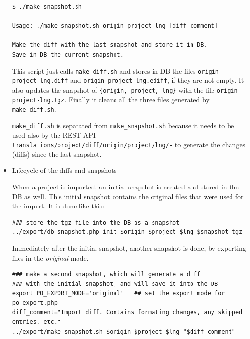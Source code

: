 \documentclass[11pt]{article}
\begin{document}
\begin{itemize}
\begin{verbatim}
$ ./make_snapshot.sh

Usage: ./make_snapshot.sh origin project lng [diff_comment]

Make the diff with the last snapshot and store it in DB.
Save in DB the current snapshot.
\end{verbatim}



     This script just calls \texttt{make\_diff.sh} and stores in DB the files
     \texttt{origin-project-lng.diff} and \texttt{origin-project-lng.ediff}, if they
     are not empty. It also updates the snapshot of \texttt{\{origin, project,      lng\}} with the file \texttt{origin-project-lng.tgz}. Finally it cleans all
     the three files generated by \texttt{make\_diff.sh}.

     \texttt{make\_diff.sh} is separated from \texttt{make\_snapshot.sh} because it
     needs to be used also by the REST API
     \texttt{translations/project/diff/origin/project/lng/-} to generate the
     changes (diffs) since the last snapshot.



\item Lifecycle of the diffs and snapshots\\
\label{sec-8.4.4.5}


     When a project is imported, an initial snapshot is created and
     stored in the DB as well. This initial snapshot contains the
     original files that were used for the import. It is done like this:

\begin{verbatim}
### store the tgz file into the DB as a snapshot
../export/db_snapshot.php init $origin $project $lng $snapshot_tgz
\end{verbatim}



     Immediately after the initial snapshot, another snapshot is done,
     by exporting files in the \emph{original} mode.

\begin{verbatim}
### make a second snapshot, which will generate a diff
### with the initial snapshot, and will save it into the DB
export PO_EXPORT_MODE='original'   ## set the export mode for po_export.php
diff_comment="Import diff. Contains formating changes, any skipped entries, etc."
../export/make_snapshot.sh $origin $project $lng "$diff_comment"
\end{verbatim}



\end{itemize}
\end{document}
